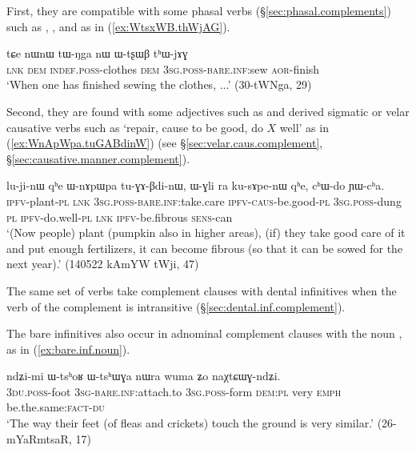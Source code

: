 First, they are compatible with some phasal verbs (§\ref{sec:phasal.complements}) such as , ,  and  as in (\ref{ex:WtsxWB.thWjAG}).

\begin{exe} 
\ex \label{ex:WtsxWB.thWjAG}
\gll  tɕe nɯnɯ tɯ-ŋga nɯ ɯ-tʂɯβ tʰɯ-jɤɣ \\
\textsc{lnk} \textsc{dem} \textsc{indef}.\textsc{poss}-clothes \textsc{dem} \textsc{3sg}.\textsc{poss}-\textsc{bare}.\textsc{inf}:sew \textsc{aor}-finish   \\
\glt `When one has finished sewing the clothes, ...' (30-tWNga, 29)
\end{exe} 

Second, they are found with some adjectives such as  and derived sigmatic or velar causative verbs such as  `repair, cause to be good, do $X$ well' as in (\ref{ex:WnApWpa.tuGABdinW}) (see §\ref{sec:velar.caus.complement}, §\ref{sec:causative.manner.complement}).

\begin{exe} 
\ex \label{ex:WnApWpa.tuGABdinW}
\gll lu-ji-nɯ qʰe ɯ-nɤpɯpa tu-ɣɤ-βdi-nɯ, ɯ-ɣli ra ku-sɤpe-nɯ qʰe, cʰɯ-do ɲɯ-cʰa. \\
\textsc{ipfv}-plant-\textsc{pl} \textsc{lnk} \textsc{3sg}.\textsc{poss}-\textsc{bare}.\textsc{inf}:take.care \textsc{ipfv}-\textsc{caus}-be.good-\textsc{pl} \textsc{3sg}.\textsc{poss}-dung \textsc{pl} \textsc{ipfv}-do.well-\textsc{pl} \textsc{lnk} \textsc{ipfv}-be.fibrous \textsc{sens}-can \\
\glt `(Now people) plant (pumpkin also in higher areas), (if) they take good care of it and put enough fertilizers, it can become fibrous (so that it can be sowed for the next year).' (140522 kAmYW tWji, 47)
\end{exe} 

The same set of verbs take complement clauses with dental infinitives when the verb of the complement is intransitive (§\ref{sec:dental.inf.complement}).

The bare infinitives also occur in adnominal complement clauses with the noun , as in (\ref{ex:bare.inf.noun}).

\begin{exe}
\ex \label{ex:bare.inf.noun}
\gll ndʑi-mi ɯ-tsʰoʁ ɯ-tsʰɯɣa nɯra wuma ʑo naχtɕɯɣ-ndʑi.   \\
\textsc{3du}.\textsc{poss}-foot \textsc{3sg}-\textsc{bare}.\textsc{inf:}attach.to \textsc{3sg}.\textsc{poss}-form \textsc{dem}:\textsc{pl} very \textsc{emph} be.the.same:\textsc{fact}-\textsc{du}  \\
\glt `The way their feet (of fleas and crickets) touch the ground is very similar.' (26-mYaRmtsaR, 17)
\end{exe}

